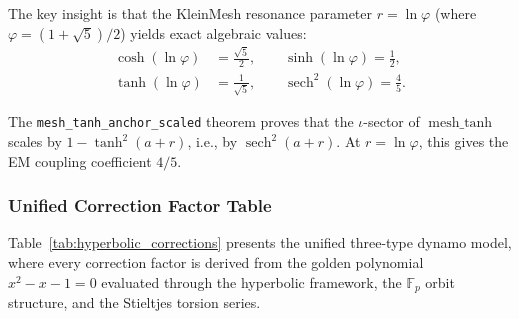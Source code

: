The key insight is that the KleinMesh resonance parameter $r = \ln\varphi$ (where $\varphi = (1+\sqrt{5})/2$) yields exact algebraic values:
\begin{align}
    \cosh(\ln\varphi) &= \frac{\sqrt{5}}{2}, \qquad
    \sinh(\ln\varphi) = \frac{1}{2}, \\
    \tanh(\ln\varphi) &= \frac{1}{\sqrt{5}}, \qquad
    \operatorname{sech}^2(\ln\varphi) = \frac{4}{5}.
\end{align}

The \texttt{mesh\_tanh\_anchor\_scaled} theorem proves that the $\iota$-sector of $\operatorname{mesh\_tanh}$ scales by $1 - \tanh^2(a + r)$, i.e., by $\operatorname{sech}^2(a + r)$. At $r = \ln\varphi$, this gives the EM coupling coefficient $4/5$.

\subsubsection{Unified Correction Factor Table}

Table~\ref{tab:hyperbolic_corrections} presents the unified three-type dynamo model, where every correction factor is derived from the golden polynomial $x^2 - x - 1 = 0$ evaluated through the hyperbolic framework, the $\mathbb{F}_p$ orbit structure, and the Stieltjes torsion series.

